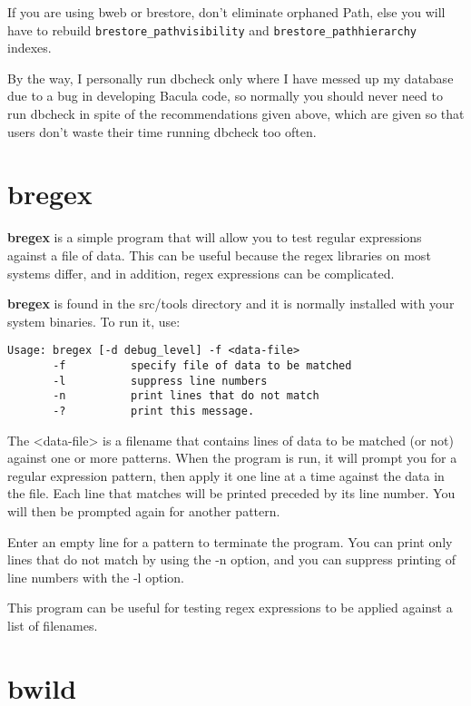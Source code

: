 If you are using bweb or brestore, don't eliminate orphaned Path, else you will
have to rebuild \texttt{brestore\_pathvisibility} and
\texttt{brestore\_pathhierarchy} indexes.

By the way, I personally run dbcheck only where I have messed up
my database due to a bug in developing Bacula code, so normally
you should never need to run dbcheck in spite of the
recommendations given above, which are given so that users don't
waste their time running dbcheck too often.

\section{bregex}
\label{bregex}

{\bf bregex} is a simple program that will allow you to test
regular expressions against a file of data. This can be useful
because the regex libraries on most systems differ, and in
addition, regex expressions can be complicated.

{\bf bregex} is found in the src/tools directory and it is
normally installed with your system binaries. To run it, use:

\begin{verbatim}
Usage: bregex [-d debug_level] -f <data-file>
       -f          specify file of data to be matched
       -l          suppress line numbers
       -n          print lines that do not match
       -?          print this message.
\end{verbatim}

The {\textless}data-file{\textgreater} is a filename that contains lines
of data to be matched (or not) against one or more patterns.
When the program is run, it will prompt you for a regular
expression pattern, then apply it one line at a time against
the data in the file. Each line that matches will be printed
preceded by its line number.  You will then be prompted again
for another pattern.

Enter an empty line for a pattern to terminate the program. You
can print only lines that do not match by using the -n option,
and you can suppress printing of line numbers with the -l option.

This program can be useful for testing regex expressions to be
applied against a list of filenames.

\section{bwild}
\label{bwild}

